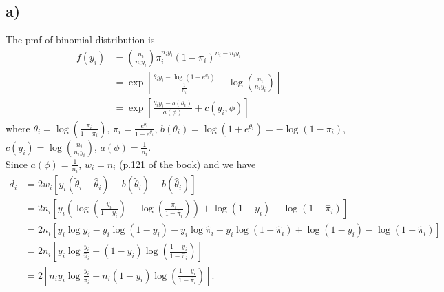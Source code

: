 \documentclass[a4paper]{article}
\begin{document}
\subsection{a)}
The pmf of binomial distribution is
\begin{align*}
f(y_{i}) &= \binom{n_{i}}{n_{i}y_{i}} \pi_{i}^{n_{i}y_{i}} (1-\pi_{i})^{n_{i}-n_{i}y_{i}}\\
&= \exp\left[\frac{\theta_{i}y_{i} -\log\left(1+e^{\theta_{i}}\right)}{\frac{1}{n_{i}}} + \log\binom{n_{i}}{n_{i}y_{i}}\right]\\
&= \exp\left[\frac{\theta_{i}y_{i} -b(\theta_{i})}{a(\phi)} + c(y_{i},\phi)\right]
\end{align*}
where $\theta_{i} = \log\left(\frac{\pi_{i}}{1-\pi_{i}}\right)$, $\pi_{i} = \frac{e^{\theta_{i}}}{1+e^{\theta_{i}}}$, $b(\theta_{i}) = \log\left(1+e^{\theta_{i}}\right) = -\log\left(1-\pi_{i}\right)$, $c(y_{i}) = \log\binom{n_{i}}{n_{i}y_{i}}$, $a(\phi) = \frac{1}{n_{i}}$.\\
Since $a(\phi) = \frac{1}{n_{i}}$, $w_{i} = n_{i}$ (p.121 of the book) and we have
\begin{align*}
d_{i} &= 2w_{i}\left[y_{i}\left(\widetilde{\theta}_{i} - \widehat{\theta}_{i}\right) -b\left(\widetilde{\theta}_{i}\right) + b\left(\widehat{\theta}_{i}\right)\right]\\
&= 2n_{i}\left[y_{i}\left(\log\left(\frac{y_{i}}{1-y_{i}}\right) -  \log\left(\frac{\widehat{\pi}_{i}}{1-\widehat{\pi}_{i}}\right)\right) +\log\left(1-y_{i}\right) -\log\left(1-\widehat{\pi}_{i}\right)\right]\\
&= 2n_{i}\left[y_{i}\log y_{i} - y_{i}\log (1-y_{i}) - y_{i}\log\widehat{\pi}_{i} +y_{i}\log(1-\widehat{\pi}_{i}) +\log\left(1-y_{i}\right) -\log\left(1-\widehat{\pi}_{i}\right)\right]\\
&= 2n_{i}\left[y_{i}\log \frac{y_{i}}{\widehat{\pi}_{i}} +(1-y_{i})\log\left(\frac{1-y_{i}}{1-\widehat{\pi}_{i}}\right)\right]\\
&= 2\left[n_{i}y_{i}\log \frac{y_{i}}{\widehat{\pi}_{i}} +n_{i}(1-y_{i})\log\left(\frac{1-y_{i}}{1-\widehat{\pi}_{i}}\right)\right].
\end{align*}

\vspace{\baselineskip}
\end{document}

